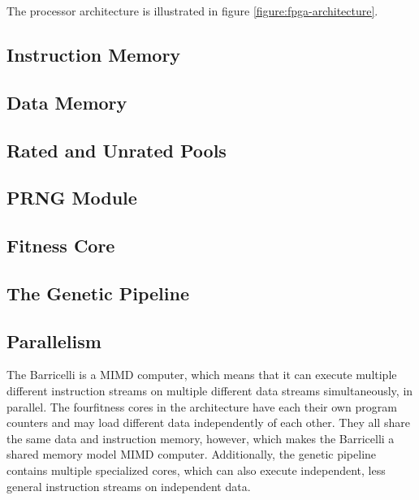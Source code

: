 The processor architecture is illustrated in figure \vref{figure:fpga-architecture}.


\subsection{Instruction Memory}
\label{subsec:fpga-instruction-memory}


\subsection{Data Memory}
\label{subsec:fpga-data-memory}


\subsection{Rated and Unrated Pools}


\subsection{PRNG Module}
    
 

\subsection{Fitness Core} \label{fpga:fitness:ss:design_of_the_fitness_core}
     \label{fpga:subsection:fitness_core}


\subsection{The Genetic Pipeline}
\label{fpga:subsection:genetic_pipeline}


\subsection{Parallelism}
The Barricelli is a MIMD computer, which means that it can execute multiple different instruction streams on multiple different data streams simultaneously, in parallel.
The four\cn fitness cores in the architecture have each their own program counters and may load different data independently of each other.
They all share the same data and instruction memory, however, which makes the Barricelli a shared memory model MIMD computer.
Additionally, the genetic pipeline contains multiple specialized cores, which can also execute independent, less general instruction streams on independent data.

